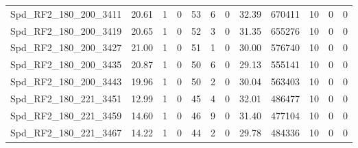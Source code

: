 \begin{longtable}[c]{@{}lrrrrrrrrrrr@{}}
Spd\_RF2\_180\_200\_3411      & 20.61                  & 1                       & 0                       & 53                     & 6                       & 0                       & 32.39                   & 670411                   & 10                       & 0                        & 0                        \\
Spd\_RF2\_180\_200\_3419      & 20.65                  & 1                       & 0                       & 52                     & 3                       & 0                       & 31.35                   & 655276                   & 10                       & 0                        & 0                        \\
Spd\_RF2\_180\_200\_3427      & 21.00                  & 1                       & 0                       & 51                     & 1                       & 0                       & 30.00                   & 576740                   & 10                       & 0                        & 0                        \\
Spd\_RF2\_180\_200\_3435      & 20.87                  & 1                       & 0                       & 50                     & 6                       & 0                       & 29.13                   & 555141                   & 10                       & 0                        & 0                        \\
Spd\_RF2\_180\_200\_3443      & 19.96                  & 1                       & 0                       & 50                     & 2                       & 0                       & 30.04                   & 563403                   & 10                       & 0                        & 0                        \\
Spd\_RF2\_180\_221\_3451      & 12.99                  & 1                       & 0                       & 45                     & 4                       & 0                       & 32.01                   & 486477                   & 10                       & 0                        & 0                        \\
Spd\_RF2\_180\_221\_3459      & 14.60                  & 1                       & 0                       & 46                     & 9                       & 0                       & 31.40                   & 477104                   & 10                       & 0                        & 0                        \\
Spd\_RF2\_180\_221\_3467      & 14.22                  & 1                       & 0                       & 44                     & 2                       & 0                       & 29.78                   & 484336                   & 10                       & 0                        & 0                        \\

\end{longtable}
